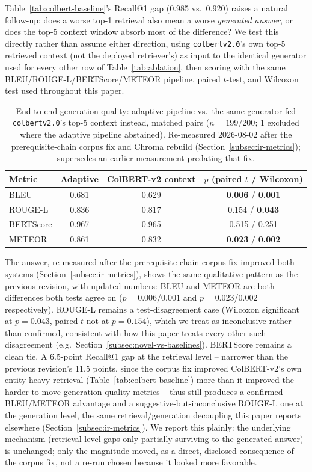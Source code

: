 \documentclass[a4paper,twoside]{article}
\begin{document}
Table~\ref{tab:colbert-baseline}'s Recall@1 gap (0.985 vs.\ 0.920) raises a natural follow-up: does a worse top-1 retrieval also mean a worse \emph{generated answer}, or does the top-5 context window absorb most of the difference? We test this directly rather than assume either direction, using \texttt{colbertv2.0}'s own top-5 retrieved context (not the deployed retriever's) as input to the identical generator used for every other row of Table~\ref{tab:ablation}, then scoring with the same BLEU/ROUGE-L/BERTScore/METEOR pipeline, paired $t$-test, and Wilcoxon test used throughout this paper.

\begin{table}[t]
\caption{End-to-end generation quality: adaptive pipeline vs.\ the same generator fed \texttt{colbertv2.0}'s top-5 context instead, matched pairs ($n=199/200$; 1 excluded where the adaptive pipeline abstained). Re-measured 2026-08-02 after the prerequisite-chain corpus fix and Chroma rebuild (Section~\ref{subsec:ir-metrics}); supersedes an earlier measurement predating that fix.}\label{tab:colbert-generation} \centering
\begin{tabular}{|l|c|c|c|}
\hline
Metric & Adaptive & ColBERT-v2 context & $p$ (paired $t$ / Wilcoxon) \\
\hline
BLEU & 0.681 & 0.629 & \textbf{0.006} / \textbf{0.001} \\
ROUGE-L & 0.836 & 0.817 & 0.154 / \textbf{0.043} \\
BERTScore & 0.967 & 0.965 & 0.515 / 0.251 \\
METEOR & 0.861 & 0.832 & \textbf{0.023} / \textbf{0.002} \\
\hline
\end{tabular}
\end{table}

The answer, re-measured after the prerequisite-chain corpus fix improved both systems (Section~\ref{subsec:ir-metrics}), shows the same qualitative pattern as the previous revision, with updated numbers: BLEU and METEOR are both differences both tests agree on ($p=0.006$/$0.001$ and $p=0.023$/$0.002$ respectively). ROUGE-L remains a test-disagreement case (Wilcoxon significant at $p=0.043$, paired $t$ not at $p=0.154$), which we treat as inconclusive rather than confirmed, consistent with how this paper treats every other such disagreement (e.g.\ Section~\ref{subsec:novel-vs-baselines}). BERTScore remains a clean tie. A 6.5-point Recall@1 gap at the retrieval level -- narrower than the previous revision's 11.5 points, since the corpus fix improved ColBERT-v2's own entity-heavy retrieval (Table~\ref{tab:colbert-baseline}) more than it improved the harder-to-move generation-quality metrics -- thus still produces a confirmed BLEU/METEOR advantage and a suggestive-but-inconclusive ROUGE-L one at the generation level, the same retrieval/generation decoupling this paper reports elsewhere (Section~\ref{subsec:ir-metrics}). We report this plainly: the underlying mechanism (retrieval-level gaps only partially surviving to the generated answer) is unchanged; only the magnitude moved, as a direct, disclosed consequence of the corpus fix, not a re-run chosen because it looked more favorable.
\end{document}
